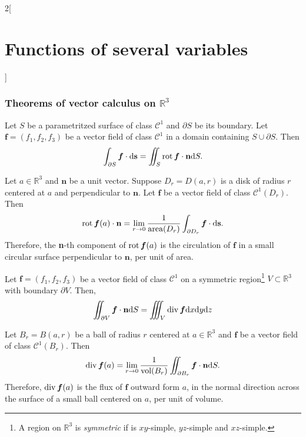 \documentclass[../../../main.tex]{subfiles}
\begin{document}
\begin{multicols}{2}[\section{Functions of several variables}]
\subsubsection*{Theorems of vector calculus on \texorpdfstring{$\mathbb{R}^3$}{R3}}
\begin{theorem}
Let $S$ be a parametritzed surface of class $\mathcal{C}^1$ and $\partial S$ be its boundary. Let $\boldsymbol{f}=(f_1,f_2,f_3)$ be a vector field of class $\mathcal{C}^1$ in a domain containing $S\cup\partial S$. Then $$\int_{\partial S}\boldsymbol{f}\cdot \dd \textbf{s}=\iint_S\operatorname{rot}\boldsymbol{f}\cdot\textbf{n} \dd S.$$
\end{theorem}
\begin{corollary}
Let $a\in\mathbb{R}^3$ and $\textbf{n}$ be a unit vector. Suppose $D_r=D(a,r)$ is a disk of radius $r$ centered at $a$ and perpendicular to $\textbf{n}$. Let $\boldsymbol{f}$ be a vector field of class $\mathcal{C}^1(D_r)$. Then $$\operatorname{rot}\boldsymbol{f}(a)\cdot\textbf{n}=\lim_{r\to 0}\frac{1}{\text{area}(D_r)}\int_{\partial D_r}\boldsymbol{f}\cdot \dd \textbf{s}.$$ Therefore, the \textbf{n}-th component of $\operatorname{rot}\boldsymbol{f}(a)$ is the circulation of $\boldsymbol{f}$ in a small circular surface perpendicular to $\textbf{n}$, per unit of area.
\end{corollary}
\begin{theorem}
Let $\boldsymbol{f}=(f_1,f_2,f_3)$ be a vector field of class $\mathcal{C}^1$ on a symmetric region\footnote{A region on $\mathbb{R}^3$ is \textit{symmetric} if is $xy$-simple, $yz$-simple and $xz$-simple.} $V\subset\mathbb{R}^3$ with boundary $\partial V$. Then, $$\iint_{\partial V}\boldsymbol{f}\cdot\textbf{n} \dd S=\iiint_V\operatorname{div}\boldsymbol{f}\dd x\dd y\dd z$$
\end{theorem}\pagebreak
\begin{corollary}
Let $B_r=B(a,r)$ be a ball of radius $r$ centered at $a\in\mathbb{R}^3$ and $\boldsymbol{f}$ be a vector field of class $\mathcal{C}^1(B_r)$. Then $$\operatorname{div}\boldsymbol{f}(a)=\lim_{r\to 0}\frac{1}{\text{vol}(B_r)}\iint_{\partial B_r}\boldsymbol{f}\cdot\textbf{n} \dd S.$$ Therefore, $\operatorname{div}\boldsymbol{f}(a)$ is the flux of $\boldsymbol{f}$ outward form $a$, in the normal direction across the surface of a small ball centered on $a$, per unit of volume.
\end{corollary}
\end{multicols}
\end{document}
